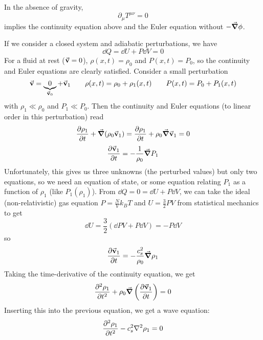 \documentclass[a4paper,twoside,master.tex]{subfiles}
\begin{document}
In the absence of gravity,
\begin{equation}
    \partial_{\mu} T^{\mu \nu} = 0
\end{equation}
implies the continuity equation above and the Euler equation without $ - \grad{\phi} $.

If we consider a closed system and adiabatic perturbations, we have
\begin{equation}
    \dd{Q} = \dd{U} + P \dd{V} = 0
\end{equation}
For a fluid at rest ($ \va{v} = 0 $), $ \rho(x,t) = \rho_0 $ and $ P(x,t) = P_0 $, so the continuity and Euler equations are clearly satisfied. Consider a small perturbation
\begin{equation}
    \va{v} = \underbrace{0}_{\va{v}_0} + \va{v}_1 \qquad \rho(x,t) = \rho_0 + \rho_1(x,t) \qquad P(x,t) = P_0 + P_1(x,t)
\end{equation}
with $ \rho_1 \ll \rho_0 $ and $ P_1 \ll P_0 $. Then the continuity and Euler equations (to linear order in this perturbation) read
\begin{equation}
    \pdv{\rho_1}{t} + \grad{(\rho_0 \va{v}_1)} = \pdv{\rho_1}{t} + \rho_0 \grad{\va{v}_1} = 0
\end{equation}
\begin{equation}
    \pdv{\va{v}_1}{t} = - \frac{1}{\rho_0} \grad{P_1}
\end{equation}
Unfortunately, this gives us three unknowns (the perturbed values) but only two equations, so we need an equation of state, or some equation relating $ P_1 $ as a function of $ \rho_1 $ (like $ P_1(\rho_1) $). From $ \dd{Q} = 0 = \dd{U} + P \dd{V} $, we can take the ideal (non-relativistic) gas equation $ P = \frac{N}{V} k_B T $ and $ U = \frac{3}{2} PV $ from statistical mechanics to get
\begin{equation}
    \dd{U} = \frac{3}{2} \left( \dd{P} V + P \dd{V} \right) = - P \dd{V}
\end{equation}
so
\begin{equation}
    \pdv{\va{v}_1}{t} = - \frac{c_s^2}{\rho_0} \grad{\rho_1}
\end{equation}
Taking the time-derivative of the continuity equation, we get
\begin{equation}
    \pdv[2]{\rho_1}{t} + \rho_0 \grad{\left( \pdv{\va{v}_1}{t} \right)} = 0
\end{equation}
Inserting this into the previous equation, we get a wave equation:
\begin{equation}
    \pdv[2]{\rho_1}{t} - c_s^2 \laplacian{\rho_1} = 0
\end{equation}
\end{document}
